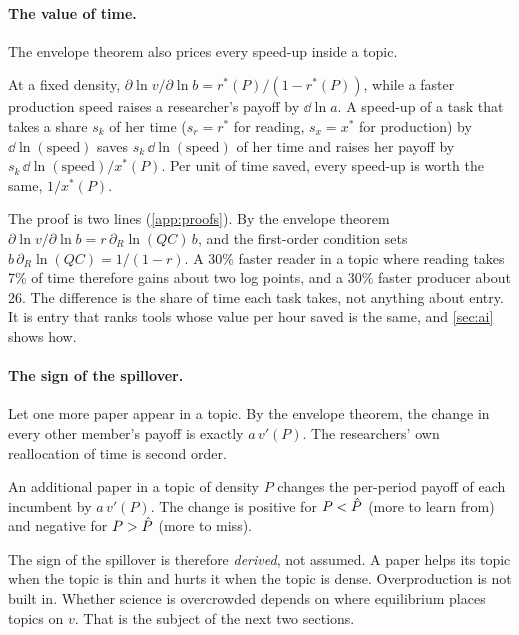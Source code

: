 \paragraph{The value of time.} The envelope theorem also prices every speed-up
inside a topic.

\begin{lemma}\label{lem:timeshares}
At a fixed density, $\partial\ln v/\partial\ln b=r^*(P)/(1-r^*(P))$, while a
faster production speed raises a researcher's payoff by $\dd\ln a$. A speed-up
of a task that takes a share $s_k$ of her time ($s_r=r^*$ for reading,
$s_x=x^*$ for production) by $\dd\ln(\text{speed})$ saves $s_k\,\dd\ln(\text{speed})$
of her time and raises her payoff by $s_k\,\dd\ln(\text{speed})/x^*(P)$. Per unit
of time saved, every speed-up is worth the same, $1/x^*(P)$.
\end{lemma}

The proof is two lines (\cref{app:proofs}). By the envelope theorem
$\partial\ln v/\partial\ln b=r\,\partial_R\ln(QC)\,b$, and the first-order
condition sets $b\,\partial_R\ln(QC)=1/(1-r)$. A 30\% faster reader in a topic
where reading takes 7\% of time therefore gains about two log points, and a
30\% faster producer about 26. The difference is the share of time each task
takes, not anything about entry. It is entry that ranks tools whose value per
hour saved is the same, and \cref{sec:ai} shows how.

\paragraph{The sign of the spillover.} Let one more paper appear in a topic. By
the envelope theorem, the change in every other member's payoff is exactly
$a\,v'(P)$. The researchers' own reallocation of time is second order.

\begin{proposition}\label{prop:externality}
An additional paper in a topic of density $P$ changes the per-period payoff of
each incumbent by $a\,v'(P)$. The change is positive for $P<\hat P$ (more to
learn from) and negative for $P>\hat P$ (more to miss).
\end{proposition}

The sign of the spillover is therefore \emph{derived}, not assumed. A paper
helps its topic when the topic is thin and hurts it when the topic is dense.
Overproduction is not built in. Whether science is overcrowded depends on
where equilibrium places topics on $v$. That is the subject of the next two
sections.
